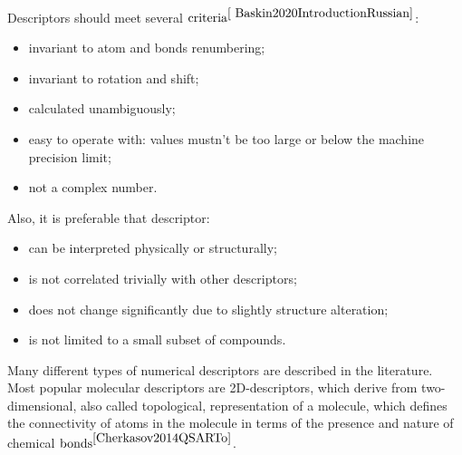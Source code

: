 \noindent Descriptors should meet several $\text{criteria}^{\cite{
Baskin2020IntroductionRussian}}$:
\begin{itemize}
    \item invariant to atom and bonds renumbering;
    \item invariant to rotation and shift;
    \item calculated unambiguously;
    \item easy to operate with: values mustn't be too large or below the machine precision limit;
    \item not a complex number.
\end{itemize}
\hfill\break
Also, it is preferable that descriptor:
\begin{itemize}
    \item can be interpreted physically or structurally;
    \item is not correlated trivially with other descriptors;
    \item does not change significantly due to slightly structure alteration;
    \item is not limited to a small subset of compounds.
\end{itemize}

\noindent Many different types of numerical descriptors are described in the literature. 
Most popular molecular descriptors are 2D-descriptors, which derive from two-dimensional, also called topological, representation of a molecule, which defines the connectivity of atoms in the molecule in terms of the presence and nature of chemical $\text{bonds}^{\cite{Cherkasov2014QSARTo}}$. 

